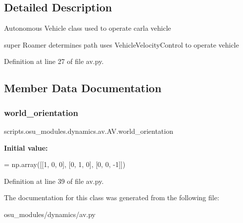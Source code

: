 \subsection{Detailed Description}
\begin{DoxyVerb}Autonomous Vehicle class used to operate carla vehicle

    super Roamer determines path
    uses VehicleVelocityControl to operate vehicle
\end{DoxyVerb}
 

Definition at line 27 of file av.\+py.



\subsection{Member Data Documentation}
\mbox{\label{classscripts_1_1osu__modules_1_1dynamics_1_1av_1_1AV_a8adc74df27841b930510ddeaefe7e4d2}} 
\subsubsection{\texorpdfstring{world\+\_\+orientation}{world\_orientation}}
{\footnotesize\ttfamily scripts.\+osu\+\_\+modules.\+dynamics.\+av.\+A\+V.\+world\+\_\+orientation\hspace{0.3cm}{\ttfamily [static]}}

{\bfseries Initial value\+:}
\begin{DoxyCode}
=  np.array([[1, 0, 0],
                                  [0, 1, 0],
                                  [0, 0, -1]])
\end{DoxyCode}


Definition at line 39 of file av.\+py.



The documentation for this class was generated from the following file\+:\begin{DoxyCompactItemize}
\item 
osu\+\_\+modules/dynamics/av.\+py\end{DoxyCompactItemize}
